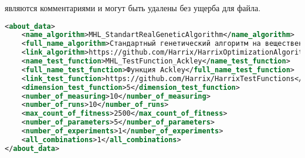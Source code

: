 \documentclass[a4paper,12pt]{article}
\begin{document}
являются комментариями и могут быть удалены без ущерба для файла.

\begin{lstlisting}[label=Part07, language=xml ,caption=Подблок без комментариев в файле Harrix Optimization Testing]
<about_data>
	<name_algorithm>MHL_StandartRealGeneticAlgorithm</name_algorithm>
	<full_name_algorithm>Стандартный генетический алгоритм на вещественных строках</full_name_algorithm>
	<link_algorithm>https://github.com/Harrix/HarrixOptimizationAlgorithms</link_algorithm>
	<name_test_function>MHL_TestFunction_Ackley</name_test_function>
	<full_name_test_function>Функция Ackley</full_name_test_function>
	<link_test_function>https://github.com/Harrix/HarrixTestFunctions</link_test_function>
	<dimension_test_function>5</dimension_test_function>
	<number_of_measuring>10</number_of_measuring>
	<number_of_runs>10</number_of_runs>
	<max_count_of_fitness>2500</max_count_of_fitness>
	<number_of_parameters>5</number_of_parameters>
	<number_of_experiments>1</number_of_experiments>
	<all_combinations>1</all_combinations>
</about_data>
\end{lstlisting}
\end{document}
